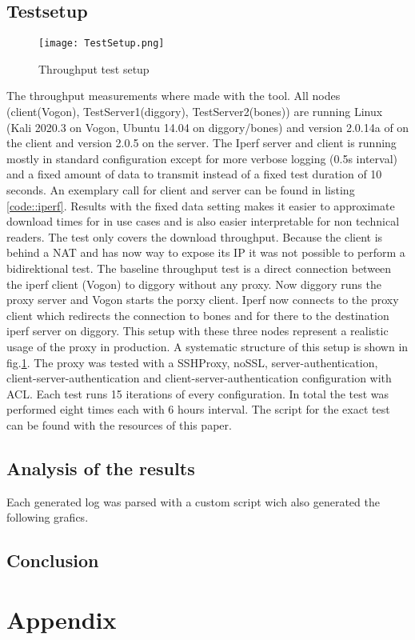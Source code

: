 \documentclass[12pt, a4paper]{scrartcl}
\begin{document}
\subsection{Testsetup}
\begin{figure}
    \centering
    \texttt{[image: TestSetup.png]}
    \caption{Throughput test setup}\label{fig::test}
\end{figure}
The throughput measurements where made with the  tool. All nodes (client(Vogon), TestServer1(diggory), TestServer2(bones)) are running Linux (Kali 2020.3 on Vogon, Ubuntu 14.04 on diggory/bones) and version 2.0.14a of  on the client and version 2.0.5 on the server. The Iperf server and client is running mostly in standard configuration except for more verbose logging (0.5s interval) and a fixed amount of data to transmit instead of a fixed test duration of 10 seconds. An exemplary call for client and server can be found in listing \ref{code::iperf}. Results with the fixed data setting makes it easier to approximate download times for in use cases and is also easier interpretable for non technical readers.\newline
The test only covers the download throughput. Because the client is behind a NAT and has now way to expose its IP it was not possible to perform a bidirektional test.\newline
The baseline throughput test is a direct connection between the iperf client (Vogon) to diggory without any proxy. Now diggory runs the proxy server and Vogon starts the porxy client. Iperf now connects to the proxy client which redirects the connection to bones and for there to the destination iperf server on diggory. This setup with these three nodes represent a realistic usage of the proxy in production. A systematic structure of this setup is shown in fig.\@\ref{fig::test}.\newline
The proxy was tested with a SSHProxy, noSSL, server-authentication, client-server-authentication and client-server-authentication configuration with \ac{ACL}. Each test runs 15 iterations of every configuration. In total the test was performed eight times each with 6 hours interval. The script for the exact test can be found with the resources of this paper.
\subsection{Analysis of the results}
Each generated log was parsed with a custom script wich also generated the following grafics.
\subsection{Conclusion}

\newpage
\renewcommand{\thesubsection}{\Alph{subsection}}
\setcounter{page}{\value{lastroman}}
\section*{Appendix}


\newpage
\listoffigures

\end{document}
